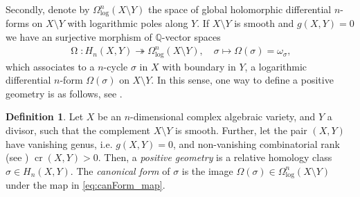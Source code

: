 \documentclass[12pt]{extarticle}
\theoremstyle{definition}
\newtheorem{definition}{Definition}[section]
\theoremstyle{theorem}
\theoremstyle{remark}
\numberwithin{equation}{section}
\newcommand{\Q}{\mathbb{Q}}
\newcommand{\crank}{\operatorname{cr}}
\begin{document}
Secondly, denote by $\Omega_{\operatorname{log}}^n(X\setminus Y)$ the space of  global holomorphic differential $n$-forms on $X\setminus Y$ with logarithmic poles along $Y$.
If $X\setminus Y$ is smooth and $g(X,Y)=0$ we have an surjective morphism of $\Q$-vector spaces
\begin{align}\label{eq:canForm_map}
    \operatorname{\Omega}:H_n(X,Y)\twoheadrightarrow\Omega_{\operatorname{log}}^n(X\setminus Y),\quad \sigma\mapsto \Omega(\sigma)=\omega_\sigma,
\end{align}
which associates to a $n$-cycle $\sigma$ in $X$ with boundary in $Y$, a logarithmic differential $n$-form $\Omega(\sigma)$ on $X\setminus Y$.
In this sense, one way to define a positive geometry is as follows, see \cite{telen2025positivegeometrypolytopespolypols}.
\begin{definition}\label{def:posgeom_BD}
    Let $X$ be an $n$-dimensional complex algebraic variety, and $Y$ a divisor, such that the complement $X\setminus Y$ is smooth.
    Further, let the pair $(X,Y)$ have vanishing genus, i.e. $g(X,Y)=0$, and non-vanishing combinatorial rank (see \cite[Definition 2.2]{brown-dupont}) $\crank(X,Y)>0$.
    Then, a \emph{positive geometry} is a relative homology class $\sigma \in H_n(X,Y)$. The \emph{canonical form} of $\sigma$ is the image $\Omega(\sigma)\in\Omega_{\operatorname{log}}^n(X\setminus Y)$ under the map in \eqref{eq:canForm_map}. 
\end{definition}
\end{document}

